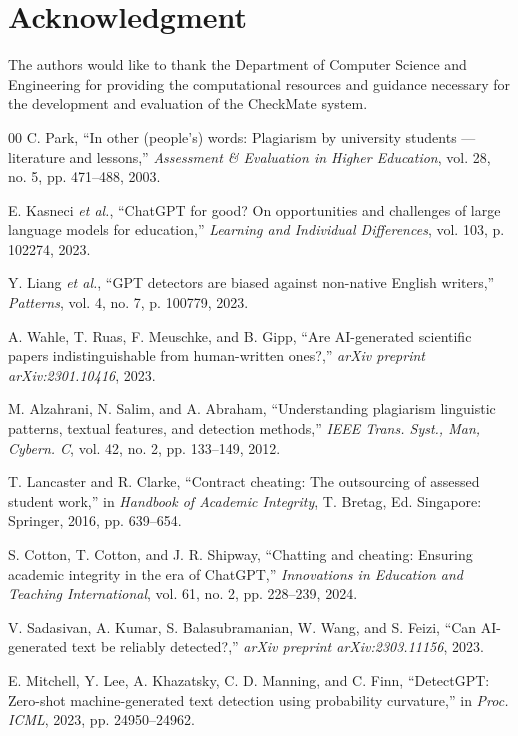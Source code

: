 \documentclass[conference]{IEEEtran}
\begin{document}
\section*{Acknowledgment}

The authors would like to thank the Department of Computer Science and Engineering for providing the computational resources and guidance necessary for the development and evaluation of the CheckMate system.

\begin{thebibliography}{00}
 C. Park, ``In other (people's) words: Plagiarism by university students --- literature and lessons,'' \textit{Assessment \& Evaluation in Higher Education}, vol. 28, no. 5, pp. 471--488, 2003.

 E. Kasneci \textit{et al.}, ``ChatGPT for good? On opportunities and challenges of large language models for education,'' \textit{Learning and Individual Differences}, vol. 103, p. 102274, 2023.

 Y. Liang \textit{et al.}, ``GPT detectors are biased against non-native English writers,'' \textit{Patterns}, vol. 4, no. 7, p. 100779, 2023.

 A. Wahle, T. Ruas, F. Meuschke, and B. Gipp, ``Are AI-generated scientific papers indistinguishable from human-written ones?,'' \textit{arXiv preprint arXiv:2301.10416}, 2023.

 M. Alzahrani, N. Salim, and A. Abraham, ``Understanding plagiarism linguistic patterns, textual features, and detection methods,'' \textit{IEEE Trans. Syst., Man, Cybern. C}, vol. 42, no. 2, pp. 133--149, 2012.

 T. Lancaster and R. Clarke, ``Contract cheating: The outsourcing of assessed student work,'' in \textit{Handbook of Academic Integrity}, T. Bretag, Ed. Singapore: Springer, 2016, pp. 639--654.

 S. Cotton, T. Cotton, and J. R. Shipway, ``Chatting and cheating: Ensuring academic integrity in the era of ChatGPT,'' \textit{Innovations in Education and Teaching International}, vol. 61, no. 2, pp. 228--239, 2024.

 V. Sadasivan, A. Kumar, S. Balasubramanian, W. Wang, and S. Feizi, ``Can AI-generated text be reliably detected?,'' \textit{arXiv preprint arXiv:2303.11156}, 2023.

 E. Mitchell, Y. Lee, A. Khazatsky, C. D. Manning, and C. Finn, ``DetectGPT: Zero-shot machine-generated text detection using probability curvature,'' in \textit{Proc. ICML}, 2023, pp. 24950--24962.


\end{thebibliography}
\end{document}
